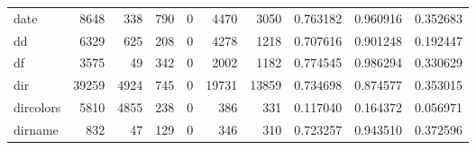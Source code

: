 \begin{tabular}{lrrrrrrrrr}
date      &                                8648 &                                             338 &                                            790 &                                             0 &                                           4470 &                                         3050 &                                           0.763182 &                               0.960916 &                             0.352683 \\
dd        &                                6329 &                                             625 &                                            208 &                                             0 &                                           4278 &                                         1218 &                                           0.707616 &                               0.901248 &                             0.192447 \\
df        &                                3575 &                                              49 &                                            342 &                                             0 &                                           2002 &                                         1182 &                                           0.774545 &                               0.986294 &                             0.330629 \\
dir       &                               39259 &                                            4924 &                                            745 &                                             0 &                                          19731 &                                        13859 &                                           0.734698 &                               0.874577 &                             0.353015 \\
dircolors &                                5810 &                                            4855 &                                            238 &                                             0 &                                            386 &                                          331 &                                           0.117040 &                               0.164372 &                             0.056971 \\
dirname   &                                 832 &                                              47 &                                            129 &                                             0 &                                            346 &                                          310 &                                           0.723257 &                               0.943510 &                             0.372596 \\

\end{tabular}
